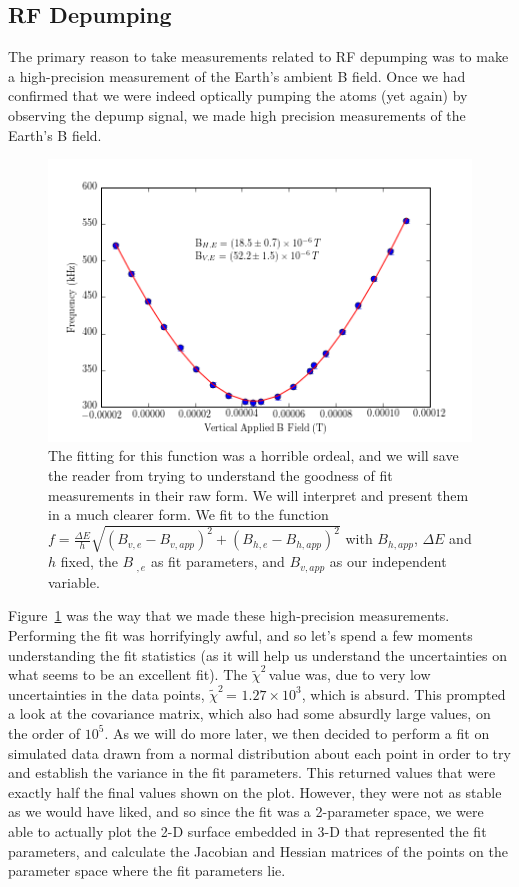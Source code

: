 \documentclass{article}
\newcommand{\redchi}{$\tilde{\chi}^2\,$}
\begin{document}
    \hspace{.25cm}

  \subsection{RF Depumping}
    The primary reason to take measurements related to RF depumping was to make a high-precision measurement of the Earth's ambient B field.  Once we had confirmed that we were indeed optically pumping the atoms (yet again) by observing the depump signal, we made high precision measurements of the Earth's B field.

    \hspace{.25cm}

    \begin{figure}[!htb]
      \centering
      \includegraphics[scale=.7]{../plots/earth_field.png}
      \caption{The fitting for this function was a horrible ordeal, and we will save the reader from trying to understand the goodness of fit measurements in their raw form.  We will interpret and present them in a much clearer form.  We fit to the function $f = \frac{\Delta E}{h}\sqrt{(B_{v,e} - B_{v,app})^2 + (B_{h,e} - B_{h,app})^2}$ with $B_{h,app}$, $\Delta E$ and $h$ fixed, the $B_{\,\,,e}$ as fit parameters, and $B_{v,app}$ as our independent variable.}
      \label{earth_field}
    \end{figure}

    Figure~\ref{earth_field} was the way that we made these high-precision measurements.  Performing the fit was horrifyingly awful, and so let's spend a few moments understanding the fit statistics (as it will help us understand the uncertainties on what seems to be an excellent fit).  The \redchi value was, due to very low uncertainties in the data points, \redchi = $1.27\times10^{3}$, which is absurd.  This prompted a look at the covariance matrix, which also had some absurdly large values, on the order of $10^5$.  As we will do more later, we then decided to perform a fit on simulated data drawn from a normal distribution about each point in order to try and establish the variance in the fit parameters.  This returned values that were exactly half the final values shown on the plot.  However, they were not as stable as we would have liked, and so since the fit was a 2-parameter space, we were able to actually plot the 2-D surface embedded in 3-D that represented the fit parameters, and calculate the Jacobian and Hessian matrices of the points on the parameter space where the fit parameters lie.
\end{document}
